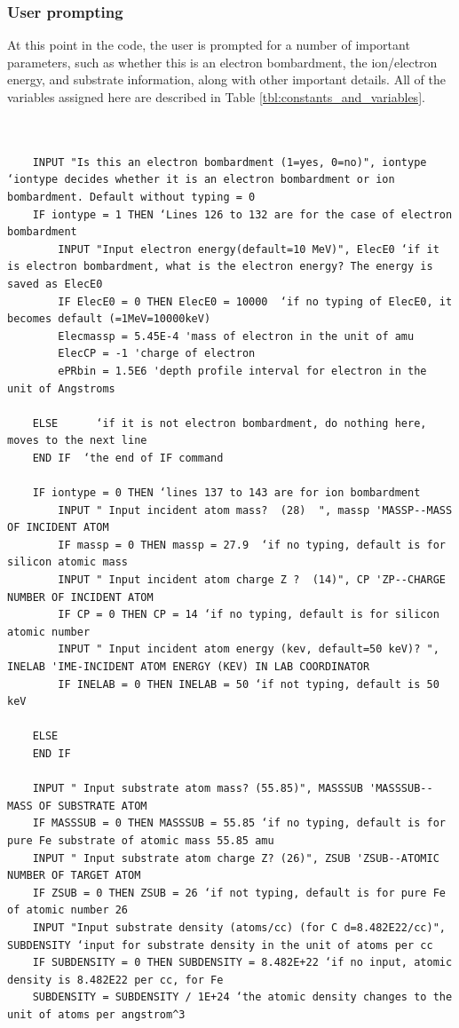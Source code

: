\documentclass[10pt, reqno]{exam}
\begin{document}
\subsubsection{User prompting}

At this point in the code, the user is prompted for a number of important parameters, such as whether this is an electron bombardment, the ion/electron energy, and substrate information, along with other important details. All of the variables assigned here are described in Table \ref{tbl:constants_and_variables}.

\begin{verbatim}
    
    
    INPUT "Is this an electron bombardment (1=yes, 0=no)", iontype  ‘iontype decides whether it is an electron bombardment or ion bombardment. Default without typing = 0
    IF iontype = 1 THEN ‘Lines 126 to 132 are for the case of electron bombardment
        INPUT "Input electron energy(default=10 MeV)", ElecE0 ‘if it is electron bombardment, what is the electron energy? The energy is saved as ElecE0
        IF ElecE0 = 0 THEN ElecE0 = 10000  ‘if no typing of ElecE0, it becomes default (=1MeV=10000keV)
        Elecmassp = 5.45E-4 'mass of electron in the unit of amu
        ElecCP = -1 'charge of electron
        ePRbin = 1.5E6 'depth profile interval for electron in the unit of Angstroms
    
    ELSE      ‘if it is not electron bombardment, do nothing here, moves to the next line
    END IF  ‘the end of IF command 
    
    IF iontype = 0 THEN ‘lines 137 to 143 are for ion bombardment
        INPUT " Input incident atom mass?  (28)  ", massp 'MASSP--MASS OF INCIDENT ATOM
        IF massp = 0 THEN massp = 27.9  ‘if no typing, default is for silicon atomic mass
        INPUT " Input incident atom charge Z ?  (14)", CP 'ZP--CHARGE NUMBER OF INCIDENT ATOM
        IF CP = 0 THEN CP = 14 ‘if no typing, default is for silicon atomic number
        INPUT " Input incident atom energy (kev, default=50 keV)? ", INELAB 'IME-INCIDENT ATOM ENERGY (KEV) IN LAB COORDINATOR
        IF INELAB = 0 THEN INELAB = 50 ‘if not typing, default is 50 keV
    
    ELSE
    END IF
    
    INPUT " Input substrate atom mass? (55.85)", MASSSUB 'MASSSUB--MASS OF SUBSTRATE ATOM
    IF MASSSUB = 0 THEN MASSSUB = 55.85 ‘if no typing, default is for pure Fe substrate of atomic mass 55.85 amu
    INPUT " Input substrate atom charge Z? (26)", ZSUB 'ZSUB--ATOMIC NUMBER OF TARGET ATOM
    IF ZSUB = 0 THEN ZSUB = 26 ‘if not typing, default is for pure Fe of atomic number 26
    INPUT "Input substrate density (atoms/cc) (for C d=8.482E22/cc)", SUBDENSITY ‘input for substrate density in the unit of atoms per cc
    IF SUBDENSITY = 0 THEN SUBDENSITY = 8.482E+22 ‘if no input, atomic density is 8.482E22 per cc, for Fe
    SUBDENSITY = SUBDENSITY / 1E+24 ‘the atomic density changes to the unit of atoms per angstrom^3
    

\end{verbatim}
\end{document}
